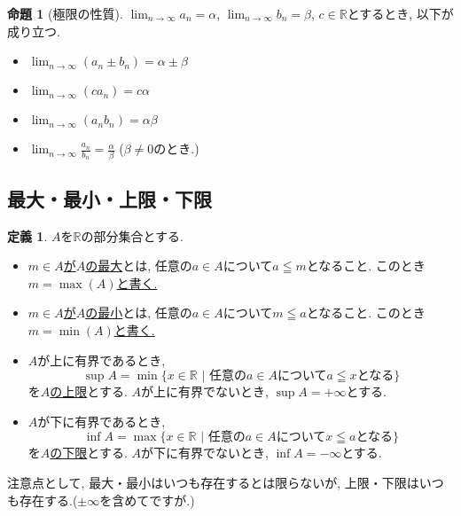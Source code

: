 \documentclass[dvipdfmx,a4paper,11pt]{article}
\newcommand{\R}{\mathbb{R}}
\theoremstyle{definition}
\newtheorem{prop}[thm]{命題}
\newtheorem{dfn}[thm]{定義}
\begin{document}
 \begin{tcolorbox}[
    colback = white,
    colframe = green!35!black,
    fonttitle = \bfseries,
    breakable = true]
    \begin{prop}[極限の性質]
  $\lim_{n \rightarrow \infty} a_n = \alpha$, 
    $\lim_{n \rightarrow \infty} b_n = \beta$, $c \in \R$とするとき,  以下が成り立つ.
 \begin{itemize}
 \item $\lim_{n \rightarrow \infty} (a_n \pm b_n) = \alpha \pm \beta$
  \item $\lim_{n \rightarrow \infty} (c a_n ) = c\alpha $
   \item $\lim_{n \rightarrow \infty} (a_n b_n) = \alpha  \beta$
    \item $\lim_{n \rightarrow \infty} \frac{a_n}{b_n} = \frac{\alpha}{\beta}$ 
    ($\beta \neq 0$のとき.)
 \end{itemize}
  
        \end{prop}
 \end{tcolorbox}
 
 \subsection{最大・最小・上限・下限}

  \begin{tcolorbox}[
    colback = white,
    colframe = green!35!black,
    fonttitle = \bfseries,
    breakable = true]
    \begin{dfn}
    $A$を$\R$の部分集合とする.
\begin{itemize}
\item \underline{$m \in A$が$A$の最大}とは, 任意の$a \in A$について$a \leqq m$となること.  このとき\underline{$m=\max(A)$と書く.}
\item \underline{$m \in A$が$A$の最小}とは, 任意の$a \in A$について$m \leqq a$となること. このとき\underline{$m=\min(A)$と書く. }
\item $A$が上に有界であるとき, 
$$
\sup A = \min \{ x \in \R \,\,| \,\, \text{任意の$a \in A$について$a \leqq x$となる}\}
$$
を\underline{$A$の上限}とする. $A$が上に有界でないとき, $\sup A = + \infty$とする.
\item $A$が下に有界であるとき, 
$$
\inf A = \max \{ x \in \R \,\,| \,\, \text{任意の$a \in A$について$x \leqq a$となる}\}
$$
を\underline{$A$の下限}とする. $A$が下に有界でないとき, $\inf A = - \infty$とする.
\end{itemize}

 \end{dfn}
 \end{tcolorbox}
 注意点として, 最大・最小はいつも存在するとは限らないが, 上限・下限はいつも存在する.($\pm \infty$を含めてですが.)
 
\end{document}
